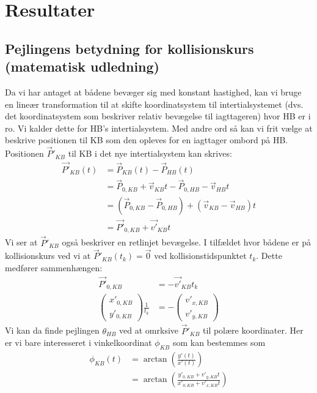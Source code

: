 \documentclass[%
 reprint,
nofootinbib,
aps,
]{revtex4-1}
\begin{document}
\section{Resultater}

\subsection{Pejlingens betydning for kollisionskurs (matematisk udledning)}\label{sec:pejling_betydning}
Da vi har antaget at bådene bevæger sig med konstant hastighed, kan vi bruge en lineær transformation til at skifte koordinatsystem til intertialsystemet (dvs. det koordinatsystem som beskriver relativ bevægelse til iagttageren) hvor HB er i ro. Vi kalder dette for HB's intertialsystem. Med andre ord så kan vi frit vælge at beskrive positionen til KB som den opleves for en iagttager ombord på HB. Positionen $\vec{P}'_{KB}$ til KB i det nye intertialsystem kan skrives:
\begin{align*}
  \vec{P'}_{KB}(t) &= \vec{P}_{KB}(t) - \vec{P}_{HB}(t) \\
  &= \vec{P}_{0,KB} + \vec{v}_{KB}t - \vec{P}_{0,HB} - \vec{v}_{HB}t \\
  &= (\vec{P}_{0,KB} - \vec{P}_{0,HB}) + (\vec{v}_{KB} - \vec{v}_{HB})t \\
  &= \vec{P'}_{0,KB} + \vec{v'}_{KB}t
\end{align*}
Vi ser at $\vec{P}'_{KB}$ også beskriver en retlinjet bevægelse. I tilfældet hvor bådene er på kollisionskurs ved vi at $\vec{P}'_{KB}(t_k) = \vec{0}$ ved kollisionstidspunktet $t_{k}$. Dette medfører sammenhængen:
\begin{align}
  \vec{P'}_{0,KB} &= - \vec{v'}_{KB}t_k \nonumber \\
  \begin{pmatrix} x'_{0,KB} \\ y'_{0,KB} \end{pmatrix}\frac{1}{t_k} &=   -\begin{pmatrix} v'_{x,KB} \\ v'_{y,KB} \end{pmatrix}
  \label{eq:P=v}
\end{align}
Vi kan da finde pejlingen $\theta_{HB}$ ved at omrksive $\vec{P}'_{KB}$ til polære koordinater. Her er vi bare interesseret i vinkelkoordinat $\phi_{KB}$ som kan bestemmes som
\begin{align*}
  \phi_{KB}(t) &= \arctan{\left( \frac{y'(t)}{x'(t)}\right)} \\
  &= \arctan{\left( \frac{y'_{0,KB} + v'_{y,KB}t}{x'_{0,KB} + v'_{x,KB}t}\right)}
\end{align*}
\end{document}
